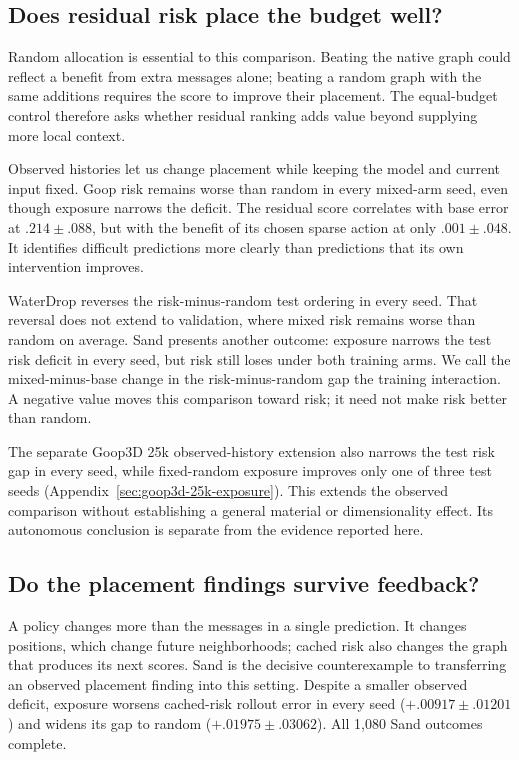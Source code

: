 \subsection{Does residual risk place the budget well?}
Random allocation is essential to this comparison. Beating the native graph could reflect a benefit from extra messages alone; beating a random graph with the same additions requires the score to improve their placement. The equal-budget control therefore asks whether residual ranking adds value beyond supplying more local context.

Observed histories let us change placement while keeping the model and current input fixed. Goop risk remains worse than random in every mixed-arm seed, even though exposure narrows the deficit. The residual score correlates with base error at $.214\pm.088$, but with the benefit of its chosen sparse action at only $.001\pm.048$. It identifies difficult predictions more clearly than predictions that its own intervention improves.

WaterDrop reverses the risk-minus-random test ordering in every seed. That reversal does not extend to validation, where mixed risk remains worse than random on average. Sand presents another outcome: exposure narrows the test risk deficit in every seed, but risk still loses under both training arms. We call the mixed-minus-base change in the risk-minus-random gap the training interaction. A negative value moves this comparison toward risk; it need not make risk better than random.

The separate Goop3D 25k observed-history extension also narrows the test risk gap in every seed, while fixed-random exposure improves only one of three test seeds (Appendix~\ref{sec:goop3d-25k-exposure}). This extends the observed comparison without establishing a general material or dimensionality effect. Its autonomous conclusion is separate from the evidence reported here.


\subsection{Do the placement findings survive feedback?}
A policy changes more than the messages in a single prediction. It changes positions, which change future neighborhoods; cached risk also changes the graph that produces its next scores. Sand is the decisive counterexample to transferring an observed placement finding into this setting. Despite a smaller observed deficit, exposure worsens cached-risk rollout error in every seed ($+.00917\pm.01201$) and widens its gap to random ($+.01975\pm.03062$). All 1,080 Sand outcomes complete.

